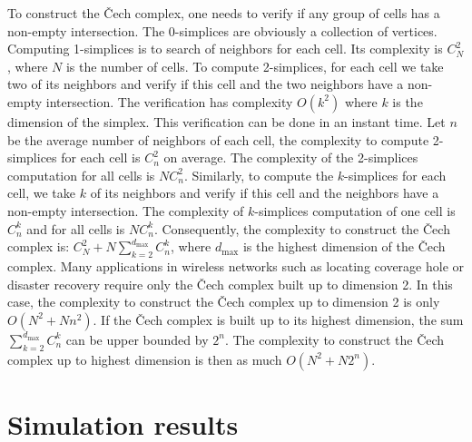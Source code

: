 \documentclass[conference]{IEEEtran}
\begin{document}
To construct the \v{C}ech complex, one needs to verify if any group of cells has a non-empty intersection.
The 0-simplices are obviously a collection of vertices.
Computing 1-simplices is to search of neighbors for each cell. Its complexity is $C^2_N$, 
where $N$ is the number of cells. To compute 2-simplices, for each cell we take two 
of its neighbors and verify if this cell and the two neighbors have a non-empty 
intersection. The verification has complexity $O(k^2)$ where $k$ is the dimension of the simplex. This verification can be done in an instant time. Let $n$ be the average number of neighbors of each cell, the complexity
to compute 2-simplices for each cell is $C^2_n$ on average. The complexity of the 2-simplices computation
for all cells is $NC^2_n$. Similarly, to compute the $k$-simplices for each cell, we take $k$ 
of its neighbors and verify if this cell and the neighbors have a non-empty intersection.
The complexity of $k$-simplices computation of one cell is $C^k_n$ and for all cells is 
$NC^k_n$. Consequently, the complexity to construct the \v{C}ech complex is: 
$C^2_N + N\sum_{k=2}^{d_{\text{max}}} C^k_n$, where $d_{\text{max}}$ is the highest
dimension of the \v{C}ech complex. 
Many applications in wireless networks such as locating coverage hole or disaster recovery require only the \v{C}ech complex built up to dimension 2. In this case, the complexity to construct the \v{C}ech complex up to dimension 2 is only $O(N^2 + Nn^2)$. If the \v{C}ech complex is built up to its highest dimension, the sum $\sum_{k=2}^{d_{\text{max}}} C^k_n$ can be upper bounded by $2^n$. The complexity
to construct the \v{C}ech complex up to highest dimension is then as much $O(N^2 + N2^n)$.

\section{Simulation results}
\label{sec:experiment}
\end{document}
